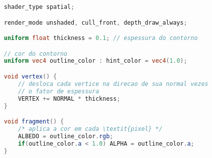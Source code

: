 \label{an:codigo-fonte-contorno-glsl}



\begin{lstlisting}[language=GLSL, caption={\label{cf:outline} \textit{Shader} GLSL 3D simples para efeito de contorno}]
shader_type spatial;

render_mode unshaded, cull_front, depth_draw_always; 

uniform float thickness = 0.1; // espessura do contorno

// cor do contorno
uniform vec4 outline_color : hint_color = vec4(1.0); 

void vertex() {
    // desloca cada vertice na direcao de sua normal vezes
	// o fator de espessura 
	VERTEX += NORMAL * thickness; 
}

void fragment() {
    /* aplica a cor em cada \textit{pixel} */
	ALBEDO = outline_color.rgb;
	if(outline_color.a < 1.0) ALPHA = outline_color.a;
}
\end{lstlisting}

\nocite{outlineGLSL}

